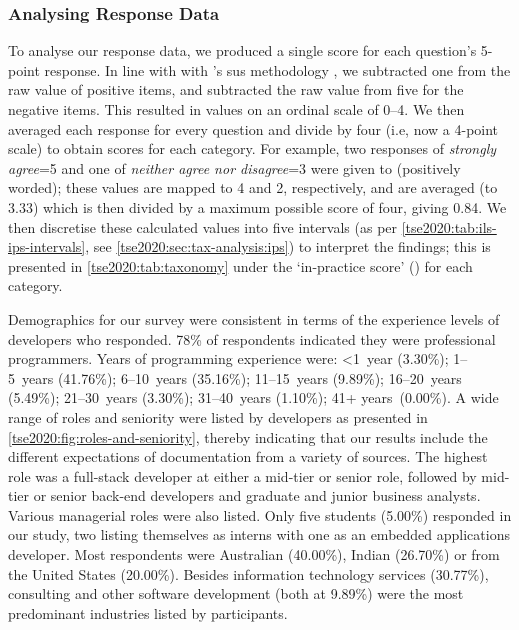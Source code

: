 \subsubsection{Analysing Response Data}
\label{tse2020:sec:validation:survey:analysis}

To analyse our response data, we produced a single score for each question's 5-point response. In line with with \citeauthor{Brooke:1996ua}'s \gls{sus} methodology \citep{Brooke:1996ua}, we subtracted one from the raw value of positive items, and subtracted the raw value from five for the negative items. This resulted in values on an ordinal scale of 0--4. We then averaged each response for every question and divide by four (i.e, now a 4-point scale) to obtain scores for each category. For example, two responses of \textit{strongly agree}=5 and one of \textit{neither agree nor disagree}=3 were given to  (positively worded); these values are mapped to 4 and 2, respectively, and are averaged (to 3.33) which is then divided by a maximum possible score of four, giving 0.84. We then discretise these calculated values into five intervals (as per \cref{tse2020:tab:ils-ips-intervals}, see \cref{tse2020:sec:tax-analysis:ips}) to interpret the findings; this is presented in \cref{tse2020:tab:taxonomy} under the `in-practice score' () for each category.

Demographics for our survey were consistent in terms of the experience levels of developers who responded. 78\% of respondents indicated they were professional programmers. Years of programming experience were: \textless 1~year (3.30\%); 1--5~years (41.76\%); 6--10~years (35.16\%); 11--15~years (9.89\%); 16--20~years (5.49\%); 21--30~years (3.30\%); 31--40~years (1.10\%); 41+ years~(0.00\%). A wide range of roles and seniority were listed by developers as presented in \cref{tse2020:fig:roles-and-seniority}, thereby indicating that our results include the different expectations of  documentation from a variety of sources. The highest role was a full-stack developer at either a mid-tier or senior role, followed by mid-tier or senior back-end developers and graduate and junior business analysts. Various managerial roles were also listed. Only five students (5.00\%) responded in our study, two listing themselves as interns with one as an embedded applications developer. Most respondents were Australian (40.00\%), Indian (26.70\%) or from the United States (20.00\%). Besides information technology services (30.77\%), consulting and other software development (both at 9.89\%) were the most predominant industries listed by participants.

